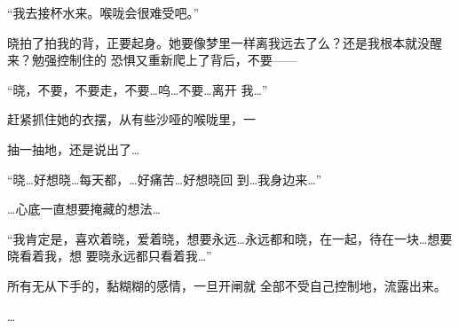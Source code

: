 \documentclass{article}
\begin{document}
“我去接杯水来。喉咙会很难受吧。” 

晓拍了拍我的背，正要起身。她要像梦里一样离我远去了么？还是我根本就没醒来？勉强控制住的
恐惧又重新爬上了背后，不要—— 

“晓，不要，不要走，不要…呜…不要…离开
我…” 

赶紧抓住她的衣摆，从有些沙哑的喉咙里，一

\newpage
抽一抽地，还是说出了… 

“晓…好想晓…每天都，…好痛苦…好想晓回
到…我身边来…” 


…心底一直想要掩藏的想法… 

“我肯定是，喜欢着晓，爱着晓，想要永远…永远都和晓，在一起，待在一块…想要晓看着我，想
要晓永远都只看着我…” 

所有无从下手的，黏糊糊的感情，一旦开闸就
全部不受自己控制地，流露出来。 

…
\end{document}
